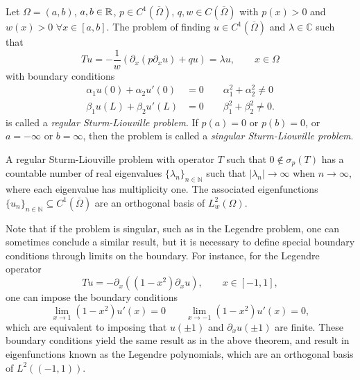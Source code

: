 \begin{definition}
    Let $\Omega = (a,b)$, $a,b\in\mathbb{R}$, $p\in C^1(\overline{\Omega})$, $q,w\in C(\overline{\Omega})$  with $p(x)>0$ and $w(x)>0$ $\forall x\in[a,b]$. The problem of finding $u\in C^1(\overline{\Omega})$ and $\lambda\in\mathbb{C}$ such that 
    \begin{equation*}
        Tu = -\frac{1}{w}(\partial_x(p\partial_x u) + qu) = \lambda u,\qquad x\in\Omega
    \end{equation*}
    with boundary conditions 
    \begin{align*}
        \alpha_1 u(0) + \alpha_2 u'(0)&=0 \qquad \alpha_1^2 + \alpha_2^2 \neq 0\\
        \beta_1 u(L) + \beta_2 u'(L)&=0 \qquad \beta_1^2 + \beta_2^2 \neq 0.
    \end{align*}
    is called a \textit{regular Sturm-Liouville problem}. If $p(a)=0$ or $p(b)=0$, or $a=-\infty$ or $b=\infty$, then the problem is called a \textit{singular Sturm-Liouville problem}.
\end{definition}
\begin{theorem}
    A regular Sturm-Liouville problem with operator $T$ such that $0\notin \sigma_p(T)$ has a countable number of real eigenvalues $\{\lambda_n\}_{n\in\mathbb N}$ such that $|\lambda_n|\to\infty$ when $n\to\infty$, where each eigenvalue has multiplicity one. The associated eigenfunctions $\{u_n\}_{n\in\mathbb N}\subseteq C^1(\overline{\Omega})$ are an orthogonal basis of $L^2_w(\Omega)$. 
\end{theorem}
Note that if the problem is singular, such as in the Legendre problem, one can sometimes conclude a similar result, but it is necessary to define special boundary conditions through limits on the boundary. For instance, for the Legendre operator 
\begin{equation*}
    Tu = -\partial_x ((1-x^2)\partial_x u),\qquad x\in[-1,1],
\end{equation*}
one can impose the boundary conditions 
\begin{equation*}
    \lim_{x\to 1}(1-x^2)u'(x)=0\qquad \lim_{x\to -1}(1-x^2)u'(x)=0,
\end{equation*}
which are equivalent to imposing that $u(\pm 1)$ and $\partial_x u(\pm 1)$ are finite. These boundary conditions yield the same result as in the above theorem, and result in  eigenfunctions known as the Legendre polynomials, which are an orthogonal basis of $L^2((-1,1))$. 

